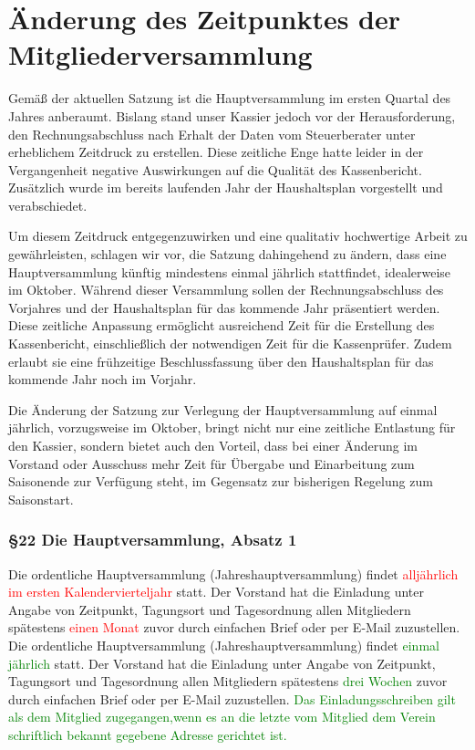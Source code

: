 \documentclass[10pt,a4paper,parskip=half]{scrartcl}
\newcommand{\new}[1]{\textcolor{Green}{#1}}
\newcommand{\old}[1]{\textcolor{Red}{#1}}
\newcommand{\change}[1]{
  \begin{adjustwidth}{20pt}{20pt}
    #1
  \end{adjustwidth}
}
\newcommand{\compare}[3]{\change{\subsubsection*{#1}\begin{multicols}{2}#2\columnbreak\\#3\end{multicols}}}
\begin{document}
\section{Änderung des Zeitpunktes der Mitgliederversammlung}
Gemäß der aktuellen Satzung ist die Hauptversammlung im ersten Quartal des Jahres anberaumt. Bislang stand unser Kassier jedoch vor der Herausforderung, den Rechnungsabschluss nach Erhalt der Daten vom Steuerberater unter erheblichem Zeitdruck zu erstellen. Diese zeitliche Enge hatte leider in der Vergangenheit negative Auswirkungen auf die Qualität des Kassenbericht. Zusätzlich wurde im bereits laufenden Jahr der Haushaltsplan vorgestellt und verabschiedet.

Um diesem Zeitdruck entgegenzuwirken und eine qualitativ hochwertige Arbeit zu gewährleisten, schlagen wir vor, die Satzung dahingehend zu ändern, dass eine Hauptversammlung künftig mindestens einmal jährlich stattfindet, idealerweise im Oktober. Während dieser Versammlung sollen der Rechnungsabschluss des Vorjahres und der Haushaltsplan für das kommende Jahr präsentiert werden. Diese zeitliche Anpassung ermöglicht ausreichend Zeit für die Erstellung des Kassenbericht, einschließlich der notwendigen Zeit für die Kassenprüfer. Zudem erlaubt sie eine frühzeitige Beschlussfassung über den Haushaltsplan für das kommende Jahr noch im Vorjahr.

Die Änderung der Satzung zur Verlegung der Hauptversammlung auf einmal jährlich, vorzugsweise im Oktober, bringt nicht nur eine zeitliche Entlastung für den Kassier, sondern bietet auch den Vorteil, dass bei einer Änderung im Vorstand oder Ausschuss mehr Zeit für Übergabe und Einarbeitung zum Saisonende zur Verfügung steht, im Gegensatz zur bisherigen Regelung zum Saisonstart.

\compare{§22 Die Hauptversammlung, Absatz 1}{
  Die ordentliche Hauptversammlung (Jahreshauptversammlung) findet \old{alljährlich im ersten Kalendervierteljahr} statt.
  Der Vorstand hat die Einladung unter Angabe von Zeitpunkt,
  Tagungsort und Tagesordnung allen Mitgliedern spätestens \old{einen Monat} zuvor durch einfachen Brief oder per E-Mail zuzustellen.
}{
  Die ordentliche Hauptversammlung (Jahreshauptversammlung) findet \new{einmal jährlich} statt.
  Der Vorstand hat die Einladung unter Angabe von Zeitpunkt,
  Tagungsort und Tagesordnung allen Mitgliedern spätestens \new{drei Wochen} zuvor durch einfachen Brief oder per E-Mail zuzustellen.
  \new{Das Einladungsschreiben gilt als dem Mitglied zugegangen,wenn es an die letzte vom Mitglied dem Verein schriftlich bekannt gegebene Adresse gerichtet ist.}
}
\end{document}
